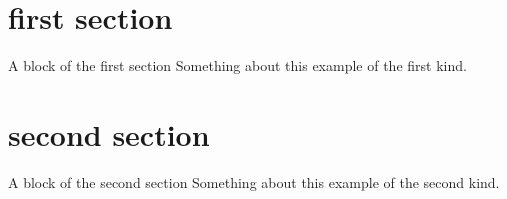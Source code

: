 \documentclass[]{beamer}
\begin{document}
\section{first section}
\begin{frame}
    \begin{block}{A  block of the first section}
        Something about this example of the first kind.
    \end{block}
    \end{frame}
\section{second section}
    \begin{frame}
    \begin{block}{A  block of the second section}
        Something about this example of the second kind.
    \end{block}

\end{frame}
\end{document}
